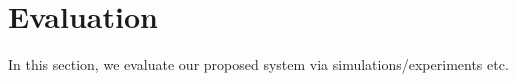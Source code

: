 \vspace{-1mm}
\section{Evaluation}
\label{sec:results}


In this section, we evaluate our proposed system via simulations/experiments etc.



